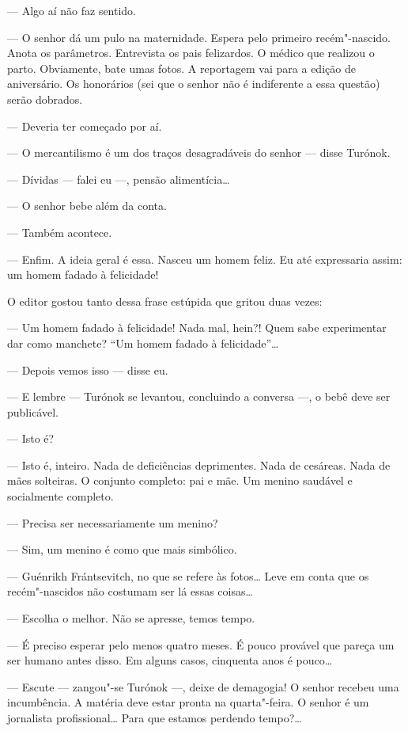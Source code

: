 --- Algo aí não faz sentido.

--- O senhor dá um pulo na maternidade. Espera pelo primeiro
recém"-nascido. Anota os parâmetros. Entrevista os pais felizardos. O
médico que realizou o parto. Obviamente, bate umas fotos. A reportagem
vai para a edição de aniversário. Os honorários (sei que o senhor não é
indiferente a essa questão) serão dobrados.

--- Deveria ter começado por aí.

--- O mercantilismo é um dos traços desagradáveis do senhor --- disse
Turónok.

--- Dívidas --- falei eu ---, pensão alimentícia\ldots{}

--- O senhor bebe além da conta.

--- Também acontece.

--- Enfim. A ideia geral é essa. Nasceu um homem feliz. Eu até
expressaria assim: um homem fadado à felicidade!

O editor gostou tanto dessa frase estúpida que gritou duas vezes:

--- Um homem fadado à felicidade! Nada mal, hein?! Quem sabe
experimentar dar como manchete? ``Um homem fadado à felicidade''\ldots{}

--- Depois vemos isso --- disse eu.

--- E lembre --- Turónok se levantou, concluindo a conversa ---, o bebê
deve ser publicável.

--- Isto é?

--- Isto é, inteiro. Nada de deficiências deprimentes. Nada de cesáreas.
Nada de mães solteiras. O conjunto completo: pai e mãe. Um menino
saudável e socialmente completo.

--- Precisa ser necessariamente um menino?

--- Sim, um menino é como que mais simbólico.

--- Guénrikh Frántsevitch, no que se refere às fotos\ldots{} Leve em conta
que os recém"-nascidos não costumam ser lá essas coisas\ldots{}

--- Escolha o melhor. Não se apresse, temos tempo.

--- É preciso esperar pelo menos quatro meses. É pouco provável que
pareça um ser humano antes disso. Em alguns casos, cinquenta anos é
pouco\ldots{}

--- Escute --- zangou"-se Turónok ---, deixe de demagogia! O senhor
recebeu uma incumbência. A matéria deve estar pronta na quarta"-feira. O
senhor é um jornalista profissional\ldots{} Para que estamos perdendo
tempo?\ldots{}


